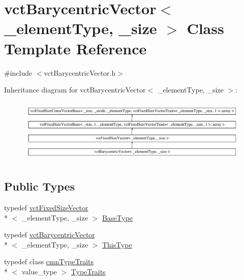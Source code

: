 \hypertarget{classvct_barycentric_vector}{\section{vct\-Barycentric\-Vector$<$ \-\_\-element\-Type, \-\_\-size $>$ Class Template Reference}
\label{classvct_barycentric_vector}
}


{\ttfamily \#include $<$vct\-Barycentric\-Vector.\-h$>$}

Inheritance diagram for vct\-Barycentric\-Vector$<$ \-\_\-element\-Type, \-\_\-size $>$\-:\begin{figure}[H]
\begin{center}
\leavevmode
\includegraphics[height=3.111111cm]{d6/def/classvct_barycentric_vector}
\end{center}
\end{figure}
\subsection*{Public Types}
\begin{DoxyCompactItemize}
\item 
typedef \hyperlink{classvct_fixed_size_vector}{vct\-Fixed\-Size\-Vector}\\*
$<$ \-\_\-element\-Type, \-\_\-size $>$ \hyperlink{classvct_barycentric_vector_aae25bb56b435677441a223ea76745bfd}{Base\-Type}
\item 
typedef \hyperlink{classvct_barycentric_vector}{vct\-Barycentric\-Vector}\\*
$<$ \-\_\-element\-Type, \-\_\-size $>$ \hyperlink{classvct_barycentric_vector_af89123d5c607a28e2328d5d370dffb33}{This\-Type}
\item 
typedef class \hyperlink{classcmn_type_traits}{cmn\-Type\-Traits}\\*
$<$ value\-\_\-type $>$ \hyperlink{classvct_barycentric_vector_a7bbb060d2097b44bfa334eb75ebb6493}{Type\-Traits}
\end{DoxyCompactItemize}
